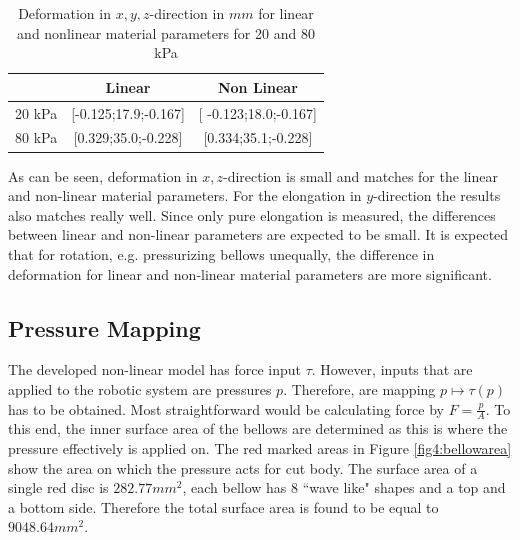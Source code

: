 \begin{table}[H]
    \centering
    \begin{tabular}{|c|c|c|}  \hline
    & \textbf{Linear}    &  \textbf{Non Linear}    \\ \hline
      [x;y;z] 20 kPa   &  [-0.125;17.9;-0.167]     &         [ -0.123;18.0;-0.167]           \\ \hline
     [x,y,z] 80 kPa   &  [0.329;35.0;-0.228]    &       [0.334;35.1;-0.228]             \\ \hline
    \end{tabular}
    \caption{Deformation in  $x,y,z$-direction in $mm$ for linear and nonlinear material parameters for 20 and 80 kPa}
    \label{tab3:linnonlindef}
\end{table}

As can be seen, deformation in $x,z$-direction is small and matches for the linear and non-linear material parameters. For the elongation in $y$-direction the results also matches really well. Since only pure elongation is measured, the differences between linear and non-linear parameters are expected to be small. It is expected that for rotation, e.g. pressurizing bellows unequally, the difference in deformation for linear and non-linear material parameters are more significant.



















\subsection{Pressure Mapping}

The developed non-linear model has force input $\tau$. However, inputs that are applied to the robotic system are pressures $p$. Therefore, are mapping $p \mapsto \tau(p)$ has to be obtained. Most straightforward would be calculating force by $F = \frac{p}{A}$. To this end, the inner surface area of the bellows are determined as this is where the pressure effectively is applied on. The red marked areas in Figure \ref{fig4:bellowarea} show the area on which the pressure acts for cut body. The surface area of a single red disc is $282.77 mm^2$, each bellow has 8 ``wave like" shapes and a top and a bottom side. Therefore the total surface area is found to be equal to $9048.64 mm^2$.

